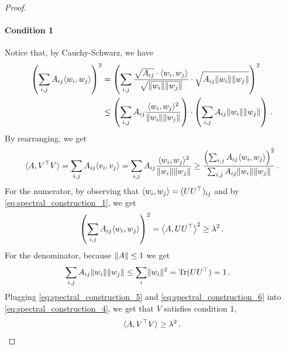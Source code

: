 \begin{proof}
    \paragraph{Condition 1}
    Notice that, by Cauchy-Schwarz, we have
    \begin{align*}
        \left(\sum_{i, j} A_{i j} \langle w_i, w_j\rangle\right)^2
        & = \left(\sum_{i, j} \frac{ \sqrt{A_{i j}} \cdot \langle w_i, w_j\rangle}{\sqrt{\lVert w_i\rVert \lVert w_j\rVert}} \cdot \sqrt{A_{i j} \lVert w_i\rVert \lVert w_j\rVert}\right)^2 \\
        & \leq \left(\sum_{i, j} A_{i j} \frac{\langle w_i, w_j\rangle^2}{\lVert w_i\rVert \lVert w_j\rVert}\right) \cdot \left(\sum_{i, j} A_{i j} \lVert w_i\rVert \lVert w_j\rVert\right) \,.
    \end{align*}
    By rearranging, we get
    \begin{equation}
    \label{eq:spectral_construction_4}
        \iprod{A, V^{\top} V}
        = \sum_{i, j} A_{i j} \iprod{v_i, v_j}
        = \sum_{i, j} A_{i j} \frac{\iprod{w_i, w_j}^2}{\norm{w_i} \norm{w_j}} \\
        \geq \frac{\Paren{\sum_{i, j} A_{i j} \iprod{w_i, w_j}}^2}{\sum_{i, j} A_{i j} \norm{w_i} \norm{w_j}} \,.
    \end{equation}
    For the numerator, by observing that $\langle w_i, w_j\rangle = (U U^{\top})_{i j}$ and by \cref{eq:spectral_construction_1}, we get
    \begin{equation}
    \label{eq:spectral_construction_5}
        \Paren{\sum_{i, j} A_{i j} \iprod{w_i, w_j}}^2
        = \Iprod{A, U U^{\top}}^2
        \geq \lambda^2 \,.
    \end{equation}
    For the denominator, because $\left\lVert A\right\rVert \leq 1$ we get
    \begin{align}
    \label{eq:spectral_construction_6}
    \begin{split}
        \sum_{i, j} A_{i j} \norm{w_i} \norm{w_j}
        &\leq  \sum_{i} \norm{w_i}^2
        = \Tr(U U^{\top})
        = 1 \,.
    \end{split}
    \end{align}
    Plugging \cref{eq:spectral_construction_5} and \cref{eq:spectral_construction_6} into \cref{eq:spectral_construction_4}, we get that $V$ satisfies condition 1,
    \begin{equation*}
        \langle A, V^{\top} V\rangle \geq \lambda^2 \,.
    \end{equation*}


\end{proof}
